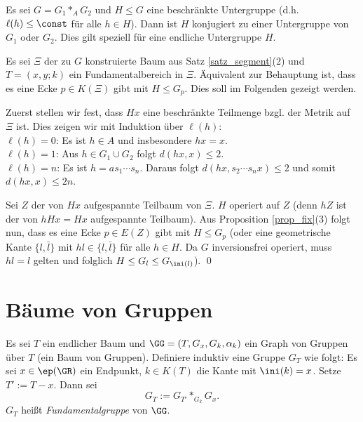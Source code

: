 \FOLG Es sei $G=G_1 *_A G_2$ und $H\leq G$ eine beschränkte
Untergruppe (d.h. $\ell(h)\leq \const$ für alle $h\in H$).
Dann ist $H$ konjugiert zu einer Untergruppe von $G_1$ oder $G_2$.
Dies gilt speziell für eine endliche Untergruppe $H$.

\bew Es sei $\Xi$ der zu $G$ konstruierte Baum aus Satz
\ref{satz_segment}(2) und $T=(x,y;k)$ ein 
Fundamentalbereich in $\Xi$.
Äquivalent zur Behauptung ist, dass es eine Ecke $p\in K(\Xi)$
gibt mit $H\leq G_p$. Dies soll im Folgenden gezeigt werden.

Zuerst stellen wir fest, dass $Hx$ eine beschränkte Teilmenge
bzgl. der Metrik auf $\Xi$ ist. Dies zeigen wir mit Induktion über
$\ell(h)$:\\
$\ell(h)=0$: Es ist $h\in A$ und insbesondere $hx=x$.\\
$\ell(h)=1$: Aus $h\in G_1 \cup G_2$ folgt $d(hx,x)\leq 2$.\\
$\ell(h)=n$: Es ist $h=a s_1 \cdots s_n$. Daraus folgt
$d(hx,s_2\cdots s_n x)\leq 2$ und somit $d(hx,x)\leq 2n$.

Sei $Z$ der von $Hx$ aufgespannte Teilbaum von $\Xi$.
$H$ operiert auf $Z$ (denn $hZ$ ist der von $hHx=Hx$ aufgespannte
Teilbaum).
Aus Proposition \ref{prop_fix}(3) folgt nun, dass es eine Ecke
$p\in E(Z)$ gibt mit $H\leq G_p$ (oder eine geometrische Kante
$\{l,\bar{l}\}$ mit $hl\in\{l,\bar{l}\}$ für alle $h\in H$.
Da $G$ inversionsfrei operiert, muss $hl=l$ gelten und
folglich $H\leq G_l \leq G_{\ini(l)}$).
\qed

\section{Bäume von Gruppen}\label{sec_BvG}

\DEF Es sei $T$ ein endlicher Baum und
$\GG=(T,G_x,G_k,\alpha_k)$ ein Graph von Gruppen über $T$
(ein \glqq Baum von Gruppen\grqq).
Definiere induktiv eine Gruppe $G_T$ wie folgt:
Es sei $x\in \ep(\GR)$ ein Endpunkt, $k\in K(T)$ die Kante mit
$\ini(k)=x$. Setze $T':= T-x$. Dann sei
\[
G_T := G_{T'} *_{G_k} G_x.
\]
$G_T$ heißt \emph{Fundamentalgruppe}
von $\GG$.

